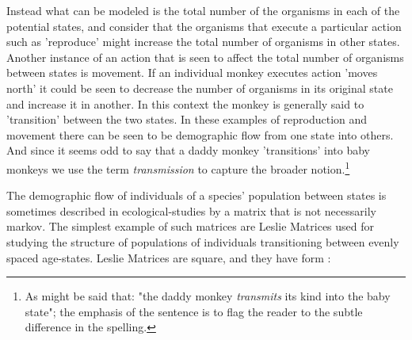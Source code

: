 Instead what can be modeled is the total number of the organisms in each of the potential states, and consider that the organisms that execute a particular action such as 'reproduce' might increase the total number of organisms in other states.
Another instance of an action that is seen to affect the total number of organisms between states is movement. If an individual monkey executes action 'moves north' it could be seen to decrease the number of organisms in its original state and increase it in another. In this context the monkey is generally said to 'transition' between the two states.
In these examples of reproduction and movement there can be seen to be demographic flow from one state into others.
And since it seems odd to say that a daddy monkey 'transitions' into baby monkeys we use the term \textit{transmission} to capture the broader notion.\footnote{As might be said that: "the daddy monkey \textit{transmits} its kind into the baby state"; the emphasis of the sentence is to flag the reader to the subtle difference in the spelling.}

The demographic flow of individuals of a species' population between states is sometimes described in ecological-studies by a matrix that is not necessarily markov.\cite{population1}
The simplest example of such matrices are Leslie Matrices used for studying the structure of populations of individuals transitioning between evenly spaced age-states.
Leslie Matrices are square, and they have form \cite{leslie}:

